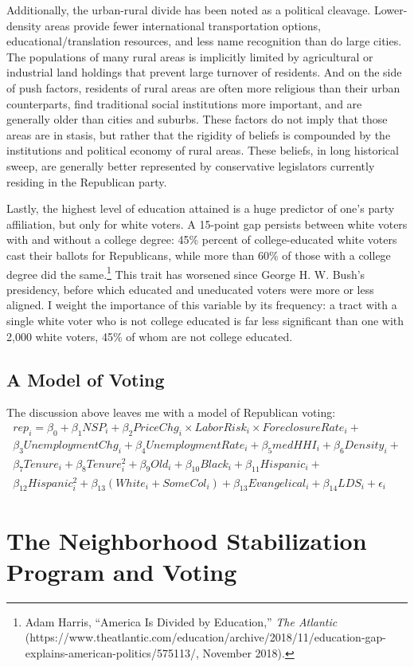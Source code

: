 \documentclass[12pt,oneside]{psthesis}
\begin{document}
Additionally, the urban-rural divide has been noted as a political cleavage.
Lower-density areas provide fewer international transportation options, educational/translation resources, and less name recognition than do large cities.
The populations of many rural areas is implicitly limited by agricultural or industrial land holdings that prevent large turnover of residents.
And on the side of push factors, residents of rural areas are often more religious than their urban counterparts, find traditional social institutions more important, and are generally older than cities and suburbs.
These factors do not imply that those areas are in stasis, but rather that the rigidity of beliefs is compounded by the institutions and political economy of rural areas.
These beliefs, in long historical sweep, are generally better represented by conservative legislators currently residing in the Republican party.

Lastly, the highest level of education attained is a huge predictor of one's party affiliation, but only for white voters.
A 15-point gap persists between white voters with and without a college degree: 45\% percent of college-educated white voters cast their ballots for Republicans, while more than 60\% of those with a college degree did the same.\footnote{Adam Harris, ``America Is Divided by Education,'' \emph{The Atlantic} (https://www.theatlantic.com/education/archive/2018/11/education-gap-explains-american-politics/575113/, November 2018).}
This trait has worsened since George H. W. Bush's presidency, before which educated and uneducated voters were more or less aligned.
I weight the importance of this variable by its frequency: a tract with a single white voter who is not college educated is far less significant than one with 2,000 white voters, 45\% of whom are not college educated.

\hypertarget{model}{%
\section{A Model of Voting}\label{model}}

The discussion above leaves me with a model of Republican voting:
\begin{multline}
rep_i = \beta_0 + \beta_1NSP_i + \beta_2{PriceChg_i \times LaborRisk_i \times ForeclosureRate_i}  + \\ \beta_3UnemploymentChg_i + \beta_4UnemploymentRate_i + \beta_5medHHI_i + \beta_6Density_i + \\
\beta_7Tenure_i + \beta_8Tenure^2_i + \beta_9Old_i + \beta_{10}Black_i + \beta_{11}Hispanic_i + \\
\beta_{12}Hispanic^2_i + \beta_{13}(White_i + SomeCol_i) + \beta_{13}Evangelical_i + \beta_{14}LDS_i + \epsilon_i
\label{eq:model}
\end{multline}
\hypertarget{outcome}{%
\chapter{The Neighborhood Stabilization Program and Voting}\label{outcome}}
\end{document}
